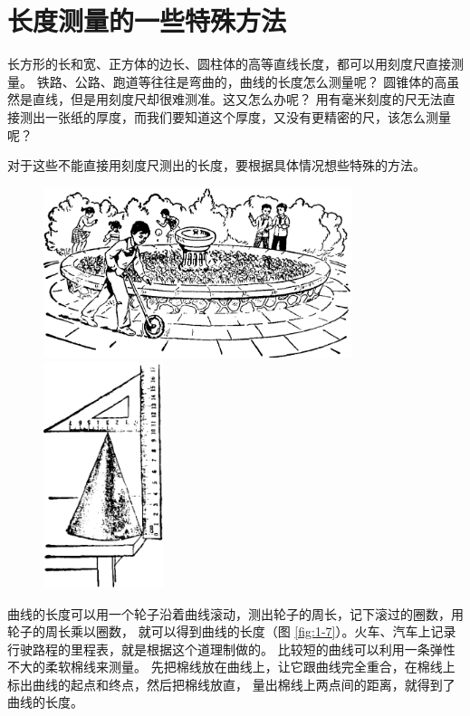 \section{长度测量的一些特殊方法}\label{sec:1-2}

长方形的长和宽、正方体的边长、圆柱体的高等直线长度，都可以用刻度尺直接测量。
铁路、公路、跑道等往往是弯曲的，曲线的长度怎么测量呢？
圆锥体的高虽然是直线，但是用刻度尺却很难测准。这又怎么办呢？
用有毫米刻度的尺无法直接测出一张纸的厚度，而我们要知道这个厚度，又没有更精密的尺，该怎么测量呢？

对于这些不能直接用刻度尺测出的长度，要根据具体情况想些特殊的方法。


\begin{figure}[htbp]
  \centering
  \begin{minipage}{9cm}
  \centering
  \includegraphics[width=9cm]{../pic/czwl1-ch1-7}
  \caption{}\label{fig:1-7}
  \end{minipage}
  \qquad
  \begin{minipage}{4cm}
  \centering
  \includegraphics[width=3.5cm]{../pic/czwl1-ch1-8}
  \caption{}\label{fig:1-8}
  \end{minipage}
\end{figure}

曲线的长度可以用一个轮子沿着曲线滚动，测出轮子的周长，记下滚过的圈数，用轮子的周长乘以圈数，
就可以得到曲线的长度（图 \ref{fig:1-7}）。火车、汽车上记录行驶路程的里程表，就是根据这个道理制做的。
比较短的曲线可以利用一条弹性不大的柔软棉线来测量。
先把棉线放在曲线上，让它跟曲线完全重合，在棉线上标出曲线的起点和终点，然后把棉线放直，
量出棉线上两点间的距离，就得到了曲线的长度。


